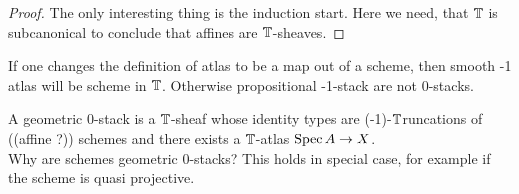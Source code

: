 \documentclass{article}
\newcommand{\affineA}{(affine ?)}
\newcommand{\truncation}{$\bT$runcation}
\newcommand{\red}[1]{{\color{red} #1}}
\begin{document}
\begin{proof}
    The only interesting thing is the induction start. Here we need, that $\mathbb{T}$ is subcanonical to conclude that affines are $\mathbb{T}$-sheaves.
\end{proof}
\begin{rmk}
    If one changes the definition of atlas to be a map out of a scheme, then smooth -1 atlas will be scheme in $\mathbb{T}$. Otherwise propositional -1-stack are not 0-stacks.
\end{rmk}
\begin{example}
    A geometric 0-stack is a $\mathbb{T}$-sheaf whose identity types are \red{(-1)-\truncation s of} (\affineA) schemes and there exists a $\mathbb{T}$-atlas $\operatorname{Spec} A \to X$. \\
    Why are schemes geometric 0-stacks? This holds in special case, for example if the scheme is quasi projective. 
\end{example}
\end{document}
